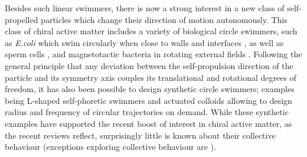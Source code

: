 \documentclass[aps,twocolumn,showlabels,showrefs,amsmath,amssymb,pre,superscriptaddress, floatfix, colors]{revtex4}
\newcommand{\1}{\begin{equation}}
\newcommand{\2}{\end{equation}}
\newcommand{\4}[2]{{\frac{#1}{#2}}}
\begin{document}
Besides such linear swimmers, there is now a strong interest in a new class of self-propelled particles which change their direction of motion autonomously.
This class of chiral active matter includes a variety of biological circle swimmers, such as \emph{E.coli} which swim circularly 
when close to walls and interfaces 
\cite{Berg1990, diLuzio2005, Lauga2006, DiLeonardo2011}, as well as  
sperm cells \cite{Friederich2012, Riedel2005}, and magnetotactic bacteria in rotating external fields \cite{Erglis2007,Cebers2011}.
Following the general principle that any deviation between the self-propulsion direction of the particle and its symmetry axis couples
its translational and rotational degrees of freedom, it has also been possible to design synthetic circle swimmers; examples being 
L-shaped self-phoretic swimmers \cite{Kummel2013,Hagen2014} and actuated colloids allowing
to design radius and frequency of circular trajectories on demand.  
While these synthetic examples have supported the recent boost of interest in chiral active matter, as the recent reviews \cite{Loewen2016, Friederich2016} reflect, 
surprisingly little is known about their collective
behaviour (exceptions exploring collective behaviour are \cite{Denk2016,Liebchen2016}).
\end{document}
